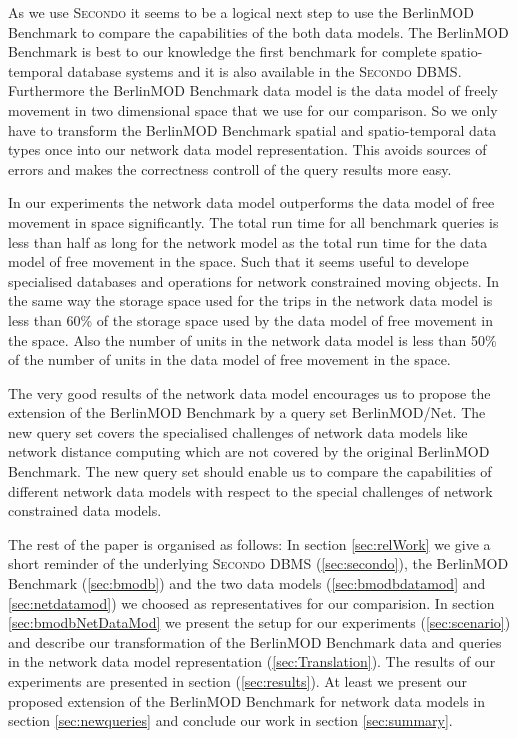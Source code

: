 \documentclass[a4paper]{article}
\newcommand{\secondo}{\textsc{Secondo}}
\newcommand{\bmodb} {BerlinMOD Benchmark}
\begin{document}
As we use \secondo{} it seems to be a logical next step to use the \bmodb{} \cite{BerlinMODVLDB} to compare the capabilities of the
both data models. The \bmodb{} is best to our knowledge the first benchmark for
complete spatio-temporal database systems and it is also available in the \secondo{}
 DBMS. Furthermore the \bmodb{} data model is the data model of freely movement
in two dimensional space that we use for our comparison. So we only have to
transform the \bmodb{} spatial and spatio-temporal data types once into our
network data model representation. This avoids sources of errors and makes the
correctness controll of the query results more easy.

In our experiments the network data model outperforms the data model of free
movement in space significantly. The total run time for all benchmark queries
is less than half as long for the network model as the total run time for
the data model of free movement in the space. Such that it seems useful to
develope specialised databases and operations for network constrained moving
objects. In the same way the storage space used for the trips in the network
data model is less than 60\% of the storage space used by the data model of free
movement in the space. Also the number of units in the network data model is
less than 50\% of the number of units in the data model of free movement in the
space.

The very good results of the network data model encourages us to propose the extension
of the \bmodb{} by a query set BerlinMOD/Net. The new query set covers the specialised
challenges of network data models like network distance computing which are not
covered by the original \bmodb{}. The new query set should enable us to compare
the capabilities of different network data models with respect to the special
challenges of network constrained data models.

The rest of the paper is organised as follows: In section \ref{sec:relWork} we give a
short reminder of the underlying \secondo{} DBMS (\ref{sec:secondo}), the \bmodb{} (\ref{sec:bmodb}) and the two data models (\ref{sec:bmodbdatamod}
 and \ref{sec:netdatamod}) we choosed as representatives for our comparision.
In section \ref{sec:bmodbNetDataMod} we present the setup for our experiments (\ref{sec:scenario}) and describe our transformation of the \bmodb{} data and
queries in the network data model representation (\ref{sec:Translation}). The
results of our experiments are presented in section (\ref{sec:results}). At least
we present our proposed extension of the \bmodb{} for network data models in section \ref{sec:newqueries} and conclude our work in section \ref{sec:summary}.
\end{document}
